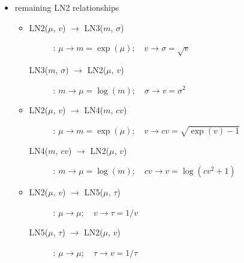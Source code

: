 {\begin{itemize}
\begin{itemize}
\begin{description}
\item[LN5($\mu$, $\tau$) $\rightarrow$ LN1($\mu$, $\sigma$)]:
$\mu \rightarrow \mu; \quad \tau \rightarrow \sigma=1/\sqrt{\tau}$
\end{description}

\item 
\begin{description}
\item[LN1($\mu$, $\sigma$) $\rightarrow$ LN6($m$, $\sigma_g$)]:
$\mu \rightarrow m=\exp(\mu); \quad \sigma \rightarrow \sigma_g=\exp(\sigma)$

\item[LN6($m$, $\sigma_g$) $\rightarrow$ LN1($\mu$, $\sigma$)]:
$m \rightarrow \mu=\log(m); \quad \sigma_g \rightarrow \sigma=\log(\sigma_g)$
\end{description}
\end{itemize}

\item 
remaining LN2 relationships
\begin{itemize}
\item 
\begin{description}
\item[LN2($\mu$, $v$) $\rightarrow$ LN3($m$, $\sigma$)]:
$\mu \rightarrow m=\exp(\mu); \quad v \rightarrow \sigma=\sqrt{v}$

\item[LN3($m$, $\sigma$) $\rightarrow$ LN2($\mu$, $v$)]:
$m \rightarrow \mu=\log(m); \quad \sigma \rightarrow v=\sigma^2$
\end{description}

\item 
\begin{description}
\item[LN2($\mu$, $v$) $\rightarrow$ LN4($m$, $cv$)]:
$\mu \rightarrow m=\exp(\mu); \quad v \rightarrow cv=\sqrt{\exp(v) -1}$

\item[LN4($m$, $cv$) $\rightarrow$ LN2($\mu$, $v$)]:
$m \rightarrow \mu=\log(m); \quad cv \rightarrow v=\log(cv^2+1)$
\end{description}

\item 
\begin{description}
\item[LN2($\mu$, $v$) $\rightarrow$ LN5($\mu$, $\tau$)]:
$\mu \rightarrow \mu; \quad v \rightarrow \tau=1/v$

\item[LN5($\mu$, $\tau$) $\rightarrow$ LN2($\mu$, $v$)]:
$\mu \rightarrow \mu; \quad \tau \rightarrow v=1/\tau$
\end{description}


\end{itemize}
\end{itemize}}
